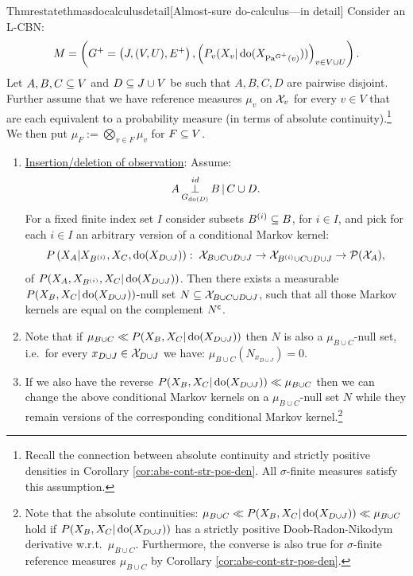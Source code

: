 \begin{restatable}{Thm}{restatethmasdocalculusdetail}[Almost-sure do-calculus---in detail]
    \label{thm:as-do-calculus-1}
    Consider an L-CBN:
    \[M= \left ( G^+=\left ( J,(V,U),E^+ \right ), \left ( P_v ( X_v|\operatorname{do}( X_{\mathrm{Pa}^{G^+}(v)})) \right )_{v \in V \cup U} \right ).\]
    Let $A,B,C \subseteq V$ and $D \subseteq J \cup V$ be such that $A,B,C,D$ are pairwise disjoint.\\
    Further assume that we have reference measures $\mu_v$ on $\mathcal{X}_v$ for every $v \in V$ that are each equivalent to a probability measure (in terms of absolute continuity).\footnote{Recall the connection between absolute continuity and strictly positive densities in Corollary \ref{cor:abs-cont-str-pos-den}. All $\sigma$-finite measures satisfy this assumption.} 
    We then put $\mu_F := \bigotimes_{v \in F} \mu_v$ for $F \subseteq V$.
\begin{enumerate}
\item \underline{Insertion/deletion of observation}: Assume:
        \[ A \operatorname*{\perp}^{id}_{G_{\operatorname{do}(D)}} B \operatorname*{|} C \cup D. \]
        For a fixed finite index set $I$ consider subsets $B^{(i)} \subseteq B$, for $i \in I$, and pick for each $i \in I$ an arbitrary version of a conditional Markov kernel:
            \[P\left ( X_A|X_{B^{(i)}},X_C,\operatorname{do}(X_{D\cup J})\right ):\;\mathcal{X}_{B \cup C \cup D \cup J} \to \mathcal{X}_{B^{(i)} \cup C \cup D \cup J} \to \mathcal{P}(\mathcal{X}_A), \]
            of $P(X_A,X_{B^{(i)}},X_C|\operatorname{do}(X_{D\cup J}))$.
            Then there exists a measurable $P(X_B,X_C|\operatorname{do}(X_{D\cup J}))$-null set
        $N \subseteq \mathcal{X}_{B \cup C \cup D \cup J}$,
        such that all those Markov kernels are equal on the complement $N^{\mathsf{c}}$.
    \item[] Note that if $\mu_{B \cup C} \ll P(X_B,X_C|\operatorname{do}(X_{D\cup J}))$ then $N$ is also a $\mu_{B \cup C}$-null set, i.e.\ for every $x_{D \cup J} \in \mathcal{X}_{D \cup J}$ we have:
        $\mu_{B \cup C} (N_{x_{D \cup J}}) =0.$
    \item[] If we also have the reverse $ P(X_B,X_C|\operatorname{do}(X_{D\cup J})) \ll \mu_{B \cup C}$ then we can change 
      the above conditional Markov kernels on a $\mu_{B \cup C}$-null set $N$ while they remain versions of the corresponding conditional Markov kernel.\footnote{Note that the absolute continuities: $\mu_{B \cup C}\ll P(X_B,X_C|\operatorname{do}(X_{D\cup J})) \ll \mu_{B \cup C}$ hold if $P(X_B,X_C|\operatorname{do}(X_{D\cup J}))$ has a strictly positive Doob-Radon-Nikodym derivative w.r.t.\ $\mu_{B \cup C}$. Furthermore, the converse is also true for $\sigma$-finite reference measures $\mu_{B \cup C}$ by Corollary \ref{cor:abs-cont-str-pos-den}.}


\end{enumerate}
\end{restatable}
